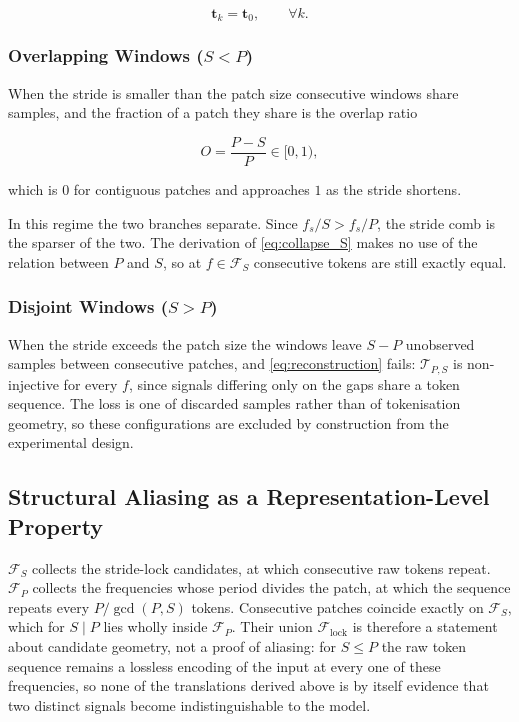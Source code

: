 \begin{equation*}
\mathbf{t}_k
=
\mathbf{t}_0,
\qquad
\forall k.
\end{equation*}

\subsubsection*{Overlapping Windows ($S<P$)}
When the stride is smaller than the patch size consecutive windows share samples, and the fraction of a patch they share is the overlap ratio

\begin{equation}
\label{eq:overlap}
O
=
\frac{P-S}{P}
\in
[0,1),
\end{equation}

which is $0$ for contiguous patches and approaches $1$ as the stride shortens.

In this regime the two branches separate. Since $f_s/S>f_s/P$, the stride comb is the sparser of the two. The derivation of \autoref{eq:collapse_S} makes no use of the relation between $P$ and $S$, so at $f\in\mathcal{F}_{S}$ consecutive tokens are still exactly equal.

\subsubsection*{Disjoint Windows ($S>P$)}
\label{sec:disjoint}
When the stride exceeds the patch size the windows leave $S-P$ unobserved samples between consecutive patches, and \autoref{eq:reconstruction} fails: $\mathcal{T}_{P,S}$ is non-injective for every $f$, since signals differing only on the gaps share a token sequence. The loss is one of discarded samples rather than of tokenisation geometry, so these configurations are excluded by construction from the experimental design.

\subsection{Structural Aliasing as a Representation-Level Property}
$\mathcal{F}_{S}$ collects the stride-lock candidates, at which consecutive raw tokens repeat. $\mathcal{F}_{P}$ collects the frequencies whose period divides the patch, at which the sequence repeats every $P/\gcd(P,S)$ tokens. Consecutive patches coincide exactly on $\mathcal{F}_{S}$, which for $S \mid P$ lies wholly inside $\mathcal{F}_{P}$. Their union $\mathcal{F}_{\mathrm{lock}}$ is therefore a statement about candidate geometry, not a proof of aliasing: for $S\le P$ the raw token sequence remains a lossless encoding of the input at every one of these frequencies, so none of the translations derived above is by itself evidence that two distinct signals become indistinguishable to the model.

